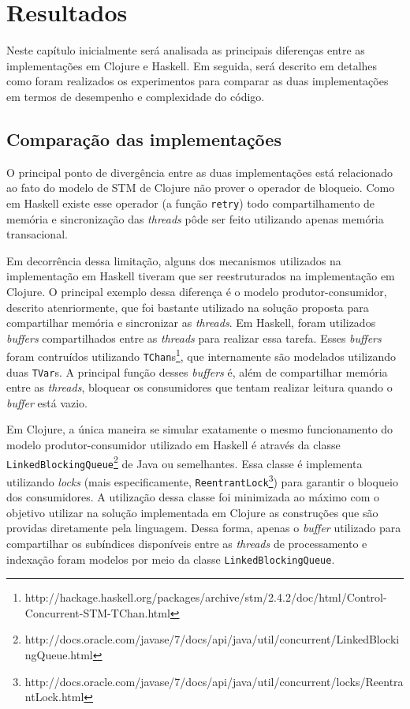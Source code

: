 \chapter{Resultados}

Neste capítulo inicialmente será analisada as principais diferenças entre as implementações em Clojure e Haskell. Em seguida, será descrito em detalhes como foram realizados os experimentos para comparar as duas implementações em termos de desempenho e complexidade do código.

\section{Comparação das implementações}

O principal ponto de divergência entre as duas implementações está relacionado ao fato do modelo de STM de Clojure não prover o operador de bloqueio. Como em Haskell existe esse operador (a função \verb|retry|) todo compartilhamento de memória e sincronização das \emph{threads} pôde ser feito utilizando apenas memória transacional.

Em decorrência dessa limitação, alguns dos mecanismos utilizados na implementação em Haskell tiveram que ser reestruturados na implementação em Clojure. O principal exemplo dessa diferença é o modelo produtor-consumidor, descrito atenriormente, que foi bastante utilizado na solução proposta para compartilhar memória e sincronizar as \emph{threads}. Em Haskell, foram utilizados \emph{buffers} compartilhados entre as \emph{threads} para realizar essa tarefa. Esses \emph{buffers} foram contruídos utilizando \verb|TChan|s\footnote{http://hackage.haskell.org/packages/archive/stm/2.4.2/doc/html/Control-Concurrent-STM-TChan.html}, que internamente são modelados utilizando duas \verb|TVar|s. A principal função desses \emph{buffers} é, além de compartilhar memória entre as \emph{threads}, bloquear os consumidores que tentam realizar leitura quando o \emph{buffer} está vazio.

Em Clojure, a única maneira se simular exatamente o mesmo funcionamento do modelo produtor-consumidor utilizado em Haskell é através da classe \verb|LinkedBlockingQueue|\footnote{http://docs.oracle.com/javase/7/docs/api/java/util/concurrent/LinkedBlockingQueue.html} de Java ou semelhantes. Essa classe é implementa utilizando \emph{locks} (mais especificamente, \verb|ReentrantLock|\footnote{http://docs.oracle.com/javase/7/docs/api/java/util/concurrent/locks/ReentrantLock.html}) para garantir o bloqueio dos consumidores. A utilização dessa classe foi minimizada ao máximo com o objetivo utilizar na solução implementada em Clojure as construções que são providas diretamente pela linguagem. Dessa forma, apenas o \emph{buffer} utilizado para compartilhar os subíndices disponíveis entre as \emph{threads} de processamento e indexação foram modelos por meio da classe \verb|LinkedBlockingQueue|.

